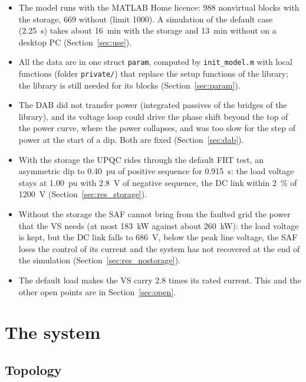 \documentclass[11pt,a4paper]{scrartcl}
\newcommand{\code}[1]{\texttt{#1}}
\begin{document}
\begin{onehalfspace}
\begin{mybox}
\begin{itemize}[nosep]
	\item The model runs with the MATLAB Home licence: \num{988} nonvirtual blocks with the storage, \num{669} without (limit \num{1000}). A simulation of the default case (\SI{2.25}{s}) takes about \SI{16}{min} with the storage and \SI{13}{min} without on a desktop PC (Section~\ref{sec:use}).
	\item All the data are in one struct \code{param}, computed by \code{init\_model.m} with local functions (folder \code{private/}) that replace the setup functions of the library; the library is still needed for its blocks (Section~\ref{sec:param}).
	\item The DAB did not transfer power (integrated passives of the bridges of the library), and its voltage loop could drive the phase shift beyond the top of the power curve, where the power collapses, and was too slow for the step of power at the start of a dip. Both are fixed (Section~\ref{sec:dab}).
	\item With the storage the UPQC rides through the default FRT test, an asymmetric dip to \SI{0.40}{pu} of positive sequence for \SI{0.915}{s}: the load voltage stays at \SI{1.00}{pu} with \SI{2.8}{V} of negative sequence, the DC link within \SI{2}{\percent} of \SI{1200}{V} (Section~\ref{sec:res_storage}).
	\item Without the storage the SAF cannot bring from the faulted grid the power that the VS needs (at most \SI{183}{\kilo\watt} against about \SI{260}{\kilo\watt}): the load voltage is kept, but the DC link falls to \SI{686}{V}, below the peak line voltage, the SAF loses the control of its current and the system has not recovered at the end of the simulation (Section~\ref{sec:res_nostorage}).
	\item The default load makes the VS carry 2.8 times its rated current. This and the other open points are in Section~\ref{sec:open}.
\end{itemize}
\end{mybox}

\section{The system}
\label{sec:system}

\subsection{Topology}


\end{onehalfspace}
\end{document}
